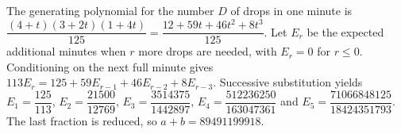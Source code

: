 The generating polynomial for the number $D$ of drops in one minute is $\dfrac{(4+t)(3+2t)(1+4t)}{125}=\dfrac{12+59t+46t^2+8t^3}{125}$. Let $E_r$ be the expected additional minutes when $r$ more drops are needed, with $E_r=0$ for $r\le0$. Conditioning on the next full minute gives $113E_r=125+59E_{r-1}+46E_{r-2}+8E_{r-3}$. Successive substitution yields $E_1=\dfrac{125}{113}$, $E_2=\dfrac{21500}{12769}$, $E_3=\dfrac{3514375}{1442897}$, $E_4=\dfrac{512236250}{163047361}$ and $E_5=\dfrac{71066848125}{18424351793}$. The last fraction is reduced, so $\boxed{a+b=89491199918}$.
